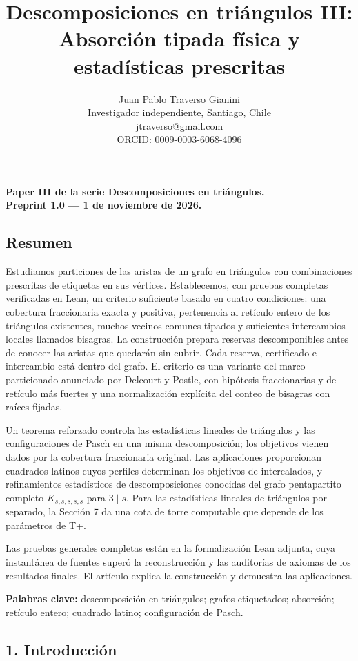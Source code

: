\documentclass[spanish,11pt,a4paper]{article}
\title{Descomposiciones en triángulos III: Absorción tipada física y estadísticas prescritas}
\author{Juan Pablo Traverso Gianini\\
\small Investigador independiente, Santiago, Chile\\
\small \href{mailto:jtraverso@gmail.com}{jtraverso@gmail.com}\\
\small ORCID: 0009-0003-6068-4096}
\date{}
\begin{document}
\raggedbottom\maketitle
\textbf{Paper III de la serie Descomposiciones en triángulos.}\\
\textbf{Preprint 1.0 --- 1 de noviembre de 2026.}

\subsection{Resumen}\label{resumen}

Estudiamos particiones de las aristas de un grafo en triángulos con combinaciones prescritas de etiquetas en sus vértices. Establecemos, con pruebas completas verificadas en Lean, un criterio suficiente basado en cuatro condiciones: una cobertura fraccionaria exacta y positiva, pertenencia al retículo entero de los triángulos existentes, muchos vecinos comunes tipados y suficientes intercambios locales llamados bisagras. La construcción prepara reservas descomponibles antes de conocer las aristas que quedarán sin cubrir. Cada reserva, certificado e intercambio está dentro del grafo. El criterio es una variante del marco particionado anunciado por Delcourt y Postle, con hipótesis fraccionarias y de retículo más fuertes y una normalización explícita del conteo de bisagras con raíces fijadas.

Un teorema reforzado controla las estadísticas lineales de triángulos y las configuraciones de Pasch en una misma descomposición; los objetivos vienen dados por la cobertura fraccionaria original. Las aplicaciones proporcionan cuadrados latinos cuyos perfiles determinan los objetivos de intercalados, y refinamientos estadísticos de descomposiciones conocidas del grafo pentapartito completo \(K_{s,s,s,s,s}\) para \(3\mid s\). Para las estadísticas lineales de triángulos por separado, la Sección 7 da una cota de torre computable que depende de los parámetros de T+.

Las pruebas generales completas están en la formalización Lean adjunta, cuya instantánea de fuentes superó la reconstrucción y las auditorías de axiomas de los resultados finales. El artículo explica la construcción y demuestra las aplicaciones.

\textbf{Palabras clave:} descomposición en triángulos; grafos etiquetados; absorción; retículo entero; cuadrado latino; configuración de Pasch.

\subsection{1. Introducción}\label{introducciuxf3n}
\end{document}
